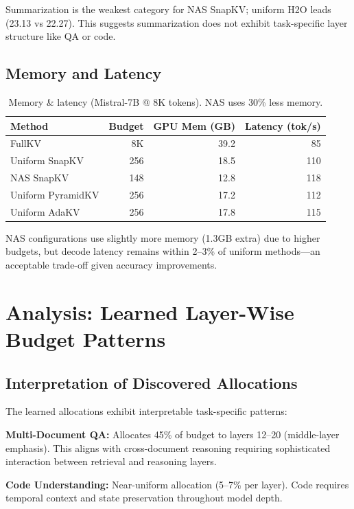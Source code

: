 \documentclass[11pt]{article}
\begin{document}
Summarization is the weakest category for NAS SnapKV; uniform H2O leads (23.13 vs 22.27). This suggests summarization does not exhibit task-specific layer structure like QA or code.

\subsection{Memory and Latency}

\begin{table}[h]
\centering
\footnotesize
\renewcommand{\arraystretch}{1.2}
\begin{tabular}{@{}l r r r@{}}
\toprule
\textbf{Method} & \textbf{Budget} & \textbf{GPU Mem (GB)} & \textbf{Latency (tok/s)} \\
\midrule
FullKV & 8K & 39.2 & 85 \\
Uniform SnapKV & 256 & 18.5 & 110 \\
NAS SnapKV & 148 & 12.8 & 118 \\
Uniform PyramidKV & 256 & 17.2 & 112 \\
Uniform AdaKV & 256 & 17.8 & 115 \\
\bottomrule
\end{tabular}
\caption{Memory \& latency (Mistral-7B @ 8K tokens). NAS uses 30\% less memory.}
\label{tab:memory}
\end{table}

NAS configurations use slightly more memory (1.3GB extra) due to higher budgets, but decode latency remains within 2–3\% of uniform methods—an acceptable trade-off given accuracy improvements.

\section{Analysis: Learned Layer-Wise Budget Patterns}

\subsection{Interpretation of Discovered Allocations}

The learned allocations exhibit interpretable task-specific patterns:

\textbf{Multi-Document QA:} Allocates 45\% of budget to layers 12–20 (middle-layer emphasis). This aligns with cross-document reasoning requiring sophisticated interaction between retrieval and reasoning layers.

\textbf{Code Understanding:} Near-uniform allocation (5–7\% per layer). Code requires temporal context and state preservation throughout model depth.
\end{document}
